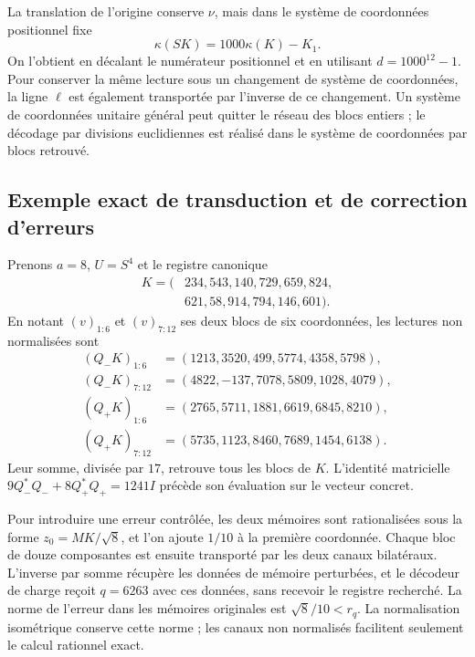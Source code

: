 La translation de l’origine conserve \(\nu\), mais dans le système de coordonnées
positionnel fixe
\begin{equation}
 \kappa(SK)=1000\kappa(K)-K_1.
 \label{lib04:cambio-origen}
\end{equation}
On l’obtient en décalant le numérateur positionnel et en utilisant
\(d=1000^{12}-1\). Pour conserver la même lecture sous un changement
de système de coordonnées, la ligne \(\ell\) est également transportée par l’inverse
de ce changement. Un système de coordonnées unitaire général peut quitter le réseau des
blocs entiers ; le décodage par divisions euclidiennes est réalisé
dans le système de coordonnées par blocs retrouvé.

\subsection{Exemple exact de transduction et de correction d’erreurs}
\label{lib04:ejemplo}

Prenons \(a=8\), \(U=S^4\) et le registre canonique
\begin{equation}
 \begin{split}
 K=(&234,543,140,729,659,824,\\
    &621,58,914,794,146,601).
 \end{split}
 \label{lib04:k-ejemplo}
\end{equation}
En notant \((v)_{1:6}\) et \((v)_{7:12}\) ses deux blocs de
six coordonnées, les lectures non normalisées sont
\begin{align}
 (Q_-K)_{1:6}&=(1213,3520,499,5774,4358,5798),\nonumber\\
 (Q_-K)_{7:12}&=(4822,-137,7078,5809,1028,4079),\nonumber\\
 (Q_+K)_{1:6}&=(2765,5711,1881,6619,6845,8210),\nonumber\\
 (Q_+K)_{7:12}&=(5735,1123,8460,7689,1454,6138).
 \label{lib04:canales-ejemplo}
\end{align}
Leur somme, divisée par \(17\), retrouve tous les blocs de \(K\).
L’identité matricielle
\(9Q_-^*Q_-+8Q_+^*Q_+=1241I\) précède son évaluation sur le
vecteur concret.

Pour introduire une erreur contrôlée, les deux mémoires sont rationalisées sous la forme \(z_0=MK/\sqrt8\), et l'on ajoute \(1/10\) à la première coordonnée. Chaque bloc de douze composantes est ensuite transporté par les deux canaux bilatéraux. L'inverse par somme récupère les données de mémoire perturbées, et le décodeur de charge reçoit \(q=6263\) avec ces données, sans recevoir le registre recherché. La norme de l'erreur dans les mémoires originales est \(\sqrt8/10<r_q\). La normalisation isométrique conserve cette norme ; les canaux non normalisés facilitent seulement le calcul rationnel exact.

